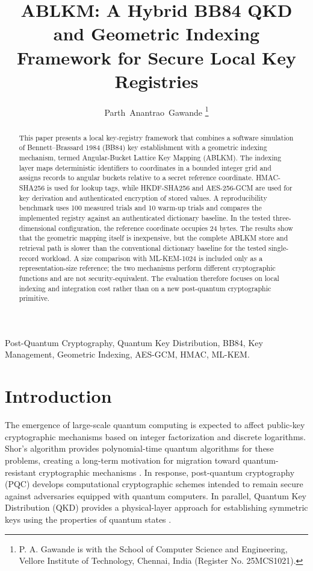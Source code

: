 \documentclass[journal,twocolumn]{IEEEtran}
\begin{document}
\title{ABLKM: A Hybrid BB84 QKD and Geometric Indexing Framework for Secure Local Key Registries}

\author{Parth~Anantrao~Gawande
\thanks{P. A. Gawande is with the School of Computer Science and Engineering, Vellore Institute of Technology, Chennai, India (Register No. 25MCS1021).}}

\maketitle

\begin{abstract}
This paper presents a local key-registry framework that combines a software simulation of Bennett--Brassard 1984 (BB84) key establishment with a geometric indexing mechanism, termed Angular-Bucket Lattice Key Mapping (ABLKM). The indexing layer maps deterministic identifiers to coordinates in a bounded integer grid and assigns records to angular buckets relative to a secret reference coordinate. HMAC-SHA256 is used for lookup tags, while HKDF-SHA256 and AES-256-GCM are used for key derivation and authenticated encryption of stored values. A reproducibility benchmark uses 100 measured trials and 10 warm-up trials and compares the implemented registry against an authenticated dictionary baseline. In the tested three-dimensional configuration, the reference coordinate occupies 24 bytes. The results show that the geometric mapping itself is inexpensive, but the complete ABLKM store and retrieval path is slower than the conventional dictionary baseline for the tested single-record workload. A size comparison with ML-KEM-1024 is included only as a representation-size reference; the two mechanisms perform different cryptographic functions and are not security-equivalent. The evaluation therefore focuses on local indexing and integration cost rather than on a new post-quantum cryptographic primitive.
\end{abstract}

\begin{IEEEkeywords}
Post-Quantum Cryptography, Quantum Key Distribution, BB84, Key Management, Geometric Indexing, AES-GCM, HMAC, ML-KEM.
\end{IEEEkeywords}

\section{Introduction}

The emergence of large-scale quantum computing is expected to affect public-key cryptographic mechanisms based on integer factorization and discrete logarithms. Shor's algorithm provides polynomial-time quantum algorithms for these problems, creating a long-term motivation for migration toward quantum-resistant cryptographic mechanisms \cite{shor1994}. In response, post-quantum cryptography (PQC) develops computational cryptographic schemes intended to remain secure against adversaries equipped with quantum computers. In parallel, Quantum Key Distribution (QKD) provides a physical-layer approach for establishing symmetric keys using the properties of quantum states \cite{bennett1984}.
\end{document}

